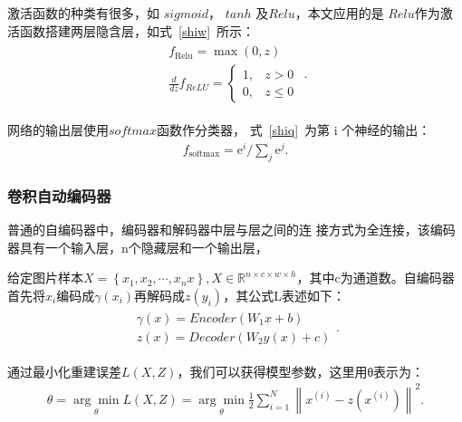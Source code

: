 \documentclass{whutmod}
\begin{document}
\begin{itemize}
	激活函数的种类有很多，如 $sigmoid$， $tanh$ 及$ Relu$，本文应用的是 $Relu$作为激活函数搭建两层隐含层，如式~\ref{shiw}~所示：
	\begin{gather}\label{shiw}
	\begin{array}{c}{f_{\text {Relu}}=\max (0, z)}\\
	\displaystyle \frac{d}{d z} f_{R e L U}=\left\{\begin{array}{ll}{1,} & {z>0} \\ {0,} & {z \leqslant 0}\end{array}\right.
	\end{array}.
	\end{gather}
	
	网络的输出层使用$ softmax $函数作分类器， 式~\ref{shiq}~为第 i 个神经的输出：
	\begin{gather*}\label{shiq}
	f_{\text {softmax}}=\mathrm{e}^{i} / \sum_{j} \mathrm{e}^{j}.
	\end{gather*}
	
			\subsubsection{卷积自动编码器}
			普通的自编码器中，编码器和解码器中层与层之间的连
			接方式为全连接，该编码器具有一个输入层，n个隐藏层和一个输出层，
			
			给定图片样本$X=\left\{ x_1,x_2,\cdots,x_nx \right\}, X\in \mathbb{R}^{n\times c\times w \times h}$，其中c为通道数。自编码器首先将$x_i$编码成$\gamma(x_i)$再解码成$z(y_i)$，其公式L表述如下：
				\begin{gather}
			\begin{array}{l}
			\gamma (x)=Encoder\left(W_{1} x+b\right) \\
			z(x)=Decoder\left(W_{2} y(x)+c\right)
			\end{array}.
			\end{gather}
			
			通过最小化重建误差$L(X,Z)$，我们可以获得模型参数，这里用θ表示为：
			\begin{gather}
			\theta=\underset{\theta}{\arg \min } L(X, Z)=\underset{\theta}{\arg \min } \frac{1}{2} \sum_{i=1}^{N}\left\|x^{(i)}-z\left(x^{(i)}\right)\right\|^{2}.
			\end{gather}


\end{itemize}
\end{document}
